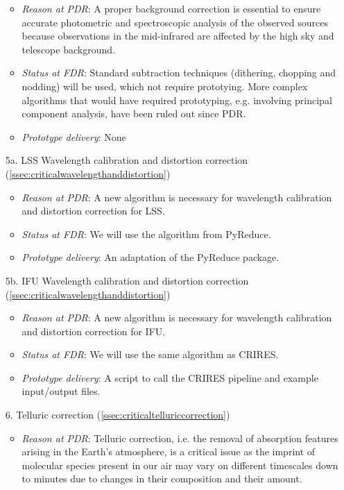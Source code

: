 \begin{enumerate}
\begin{itemize}
        \item \textit{Reason at PDR}: A proper background correction is essential to ensure accurate photometric and spectroscopic analysis of the observed sources because observations in the mid-infrared are affected by the high sky and telescope background.
        \item \textit{Status at FDR}: Standard subtraction techniques (dithering, chopping and nodding) will be used, which not require prototying. More complex algorithms that would have required prototyping, e.g.
involving principal component analysis, have been ruled out since PDR.
        \item \textit{Prototype delivery}: None
    \end{itemize}
    \item[5a.] LSS Wavelength calibration and distortion correction (\ref{ssec:criticalwavelengthanddistortion})
    \begin{itemize}
        \item \textit{Reason at PDR}: A new algorithm is necessary for wavelength calibration and distortion correction for LSS.
        \item \textit{Status at FDR}: We will use the algorithm from PyReduce.
        \item \textit{Prototype delivery}: An adaptation of the PyReduce package.
    \end{itemize}
    \item[5b.] \ac{IFU} Wavelength calibration and distortion correction (\ref{ssec:criticalwavelengthanddistortion})
    \begin{itemize}
        \item \textit{Reason at PDR}: A new algorithm is necessary for wavelength calibration and distortion correction for IFU.
        \item \textit{Status at FDR}: We will use the same algorithm as CRIRES.
        \item \textit{Prototype delivery}: A script to call the CRIRES pipeline and example input/output files.
    \end{itemize}
    \item[6.] Telluric correction (\ref{ssec:criticaltelluriccorrection})
    \begin{itemize}
        \item \textit{Reason at PDR}: Telluric correction, i.e. the removal of absorption features arising in the Earth’s atmosphere, is a critical issue as the imprint of molecular species present in our air may vary on different timescales down to minutes due to changes in their composition and their amount.

\end{itemize}
\end{enumerate}
